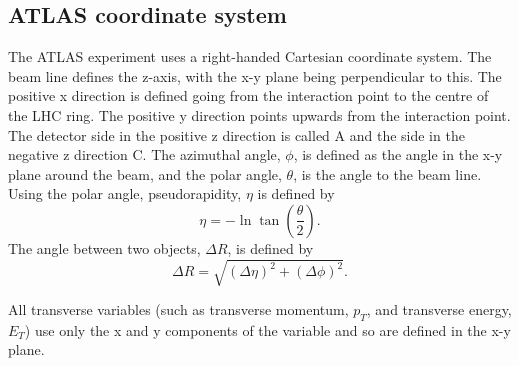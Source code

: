 \subsection{ATLAS coordinate system}
\label{sec:Det:Coord}
The ATLAS experiment uses a right-handed Cartesian coordinate system. 
The beam line defines the z-axis, with the x-y plane being perpendicular to this. 
The positive x direction is defined going from the interaction point to the centre of the LHC ring. 
The positive y direction points upwards from the interaction point. 
The detector side in the positive z direction is called A and the side in the negative z direction C.
The azimuthal angle, $\phi$, is defined as the angle in the x-y plane around the beam, and the polar angle, $\theta$, is the angle to the beam line.
Using the polar angle, pseudorapidity, $\eta$ is defined by 
\begin{equation}
\eta = - \ln \tan \left(\frac{\theta}{2}\right).
\label{Detector:eta}
\end{equation}
The angle between two objects, $\Delta R$, is defined by 
\begin{equation}
\Delta R = \sqrt{(\Delta \eta)^2+(\Delta \phi)^2} .
\label{Detector:dR}
\end{equation}

All transverse variables (such as transverse momentum, $p_T$, and transverse energy, $E_T$) use only the x and y components of the variable and so are defined in the x-y plane.
